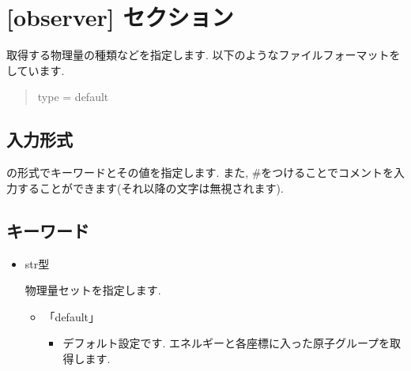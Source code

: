 \documentclass[letterpaper,10pt,dvipdfmx]{sphinxmanual}
\begin{document}
\section{{[}observer{]} セクション}
\label{\detokenize{file_specification/parameter_observer::doc}}\label{\detokenize{file_specification/parameter_observer:observer}}
取得する物理量の種類などを指定します.
以下のようなファイルフォーマットをしています.
\begin{quote}

\begin{sphinxVerbatim}[commandchars=\\\{\}]
[observer]
type = \PYGZsq{}default\PYGZsq{}
\end{sphinxVerbatim}
\end{quote}


\subsection{入力形式}
\label{\detokenize{file_specification/parameter_observer:id1}}
 の形式でキーワードとその値を指定します.
また, \#をつけることでコメントを入力することができます(それ以降の文字は無視されます).


\subsection{キーワード}
\label{\detokenize{file_specification/parameter_observer:id2}}\begin{itemize}
\item {} 

 str型

物理量セットを指定します.
\begin{itemize}
\item {} 
「default」
\begin{itemize}
\item {} 
デフォルト設定です. エネルギーと各座標に入った原子グループを取得します.

\end{itemize}

\end{itemize}

\end{itemize}
\end{document}
